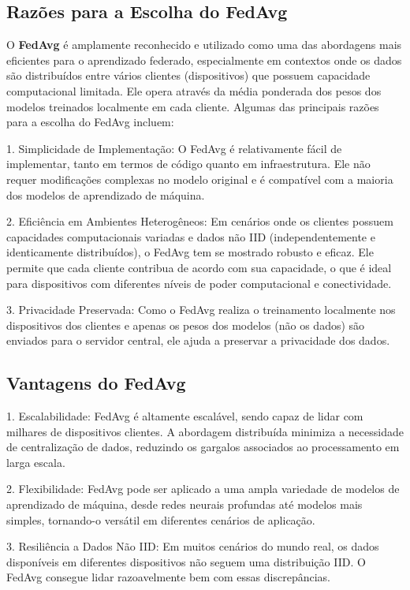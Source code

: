 \subsection{Razões para a Escolha do FedAvg}

O \textbf{FedAvg} é amplamente reconhecido e utilizado como uma das abordagens mais eficientes para o aprendizado federado, especialmente em contextos onde os dados são distribuídos entre vários clientes (dispositivos) que possuem capacidade computacional limitada. Ele opera através da média ponderada dos pesos dos modelos treinados localmente em cada cliente. Algumas das principais razões para a escolha do FedAvg incluem:

1. Simplicidade de Implementação: O FedAvg é relativamente fácil de implementar, tanto em termos de código quanto em infraestrutura. Ele não requer modificações complexas no modelo original e é compatível com a maioria dos modelos de aprendizado de máquina.

2. Eficiência em Ambientes Heterogêneos: Em cenários onde os clientes possuem capacidades computacionais variadas e dados não IID (independentemente e identicamente distribuídos), o FedAvg tem se mostrado robusto e eficaz. Ele permite que cada cliente contribua de acordo com sua capacidade, o que é ideal para dispositivos com diferentes níveis de poder computacional e conectividade.

3. Privacidade Preservada: Como o FedAvg realiza o treinamento localmente nos dispositivos dos clientes e apenas os pesos dos modelos (não os dados) são enviados para o servidor central, ele ajuda a preservar a privacidade dos dados.

\subsection{Vantagens do FedAvg}

1. Escalabilidade: FedAvg é altamente escalável, sendo capaz de lidar com milhares de dispositivos clientes. A abordagem distribuída minimiza a necessidade de centralização de dados, reduzindo os gargalos associados ao processamento em larga escala.

2. Flexibilidade: FedAvg pode ser aplicado a uma ampla variedade de modelos de aprendizado de máquina, desde redes neurais profundas até modelos mais simples, tornando-o versátil em diferentes cenários de aplicação.

3. Resiliência a Dados Não IID: Em muitos cenários do mundo real, os dados disponíveis em diferentes dispositivos não seguem uma distribuição IID. O FedAvg consegue lidar razoavelmente bem com essas discrepâncias.

